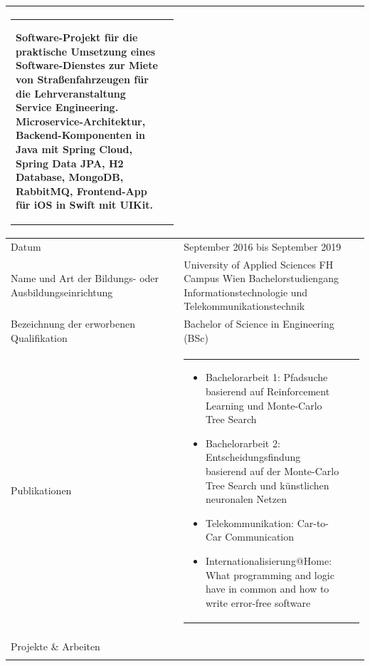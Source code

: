 \begin{longtable}{p{}|p{}}
\begin{tabular}{m{} m{} }
\begin{itemize}[nosep,leftmargin=1em]
	Software-Projekt für die praktische Umsetzung eines Software-Dienstes zur Miete von Straßenfahrzeugen für die Lehrveranstaltung \dq Service Engineering\dq. Microservice-Architektur, Backend-Komponenten in Java mit Spring Cloud, Spring Data JPA, H2 Database, MongoDB, RabbitMQ, Frontend-App für iOS in Swift mit UIKit.
	\end{itemize}
	\end{tabular} \\
	\bottomrule
	Datum & September 2016 bis September 2019 \\
	Name und Art der Bildungs- oder Ausbildungseinrichtung & University of Applied Sciences FH Campus Wien \newline
	Bachelorstudiengang Informationstechnologie und Telekommunikationstechnik \\
	Bezeichnung der erworbenen Qualifikation & Bachelor of Science in Engineering (BSc) \\
	Publikationen &
	\begin{tabular} {m{} m{} }
	\begin{itemize}[nosep,leftmargin=1em]
	\item Bachelorarbeit 1: Pfadsuche basierend auf Reinforcement Learning und Monte-Carlo Tree Search
	\item Bachelorarbeit 2: Entscheidungsfindung basierend auf der Monte-Carlo Tree Search und künstlichen neuronalen Netzen
	\item Telekommunikation: Car-to-Car Communication
	\item Internationalisierung@Home: What programming and logic have in common and how to write error-free software
	\end{itemize}
	\end{tabular}
	\\
	Projekte \& Arbeiten & %
	\begin{tabular}{m{} m{} }

\end{tabular}
\end{longtable}
